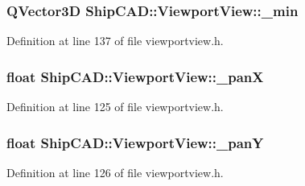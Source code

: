 \subsubsection[{\texorpdfstring{\+\_\+min}{_min}}]{\setlength{\rightskip}{0pt plus 5cm}Q\+Vector3D Ship\+C\+A\+D\+::\+Viewport\+View\+::\+\_\+min\hspace{0.3cm}{\ttfamily [protected]}}\hypertarget{classShipCAD_1_1ViewportView_a8d957ad40e793a09f4741200eec4a939}{}\label{classShipCAD_1_1ViewportView_a8d957ad40e793a09f4741200eec4a939}


Definition at line 137 of file viewportview.\+h.

\subsubsection[{\texorpdfstring{\+\_\+panX}{_panX}}]{\setlength{\rightskip}{0pt plus 5cm}float Ship\+C\+A\+D\+::\+Viewport\+View\+::\+\_\+panX\hspace{0.3cm}{\ttfamily [protected]}}\hypertarget{classShipCAD_1_1ViewportView_a3cccfb1058f0c8f66d662c1f19ed5c33}{}\label{classShipCAD_1_1ViewportView_a3cccfb1058f0c8f66d662c1f19ed5c33}


Definition at line 125 of file viewportview.\+h.

\subsubsection[{\texorpdfstring{\+\_\+panY}{_panY}}]{\setlength{\rightskip}{0pt plus 5cm}float Ship\+C\+A\+D\+::\+Viewport\+View\+::\+\_\+panY\hspace{0.3cm}{\ttfamily [protected]}}\hypertarget{classShipCAD_1_1ViewportView_aa2a8062a009ea1a9f26498a103134d3f}{}\label{classShipCAD_1_1ViewportView_aa2a8062a009ea1a9f26498a103134d3f}


Definition at line 126 of file viewportview.\+h.

